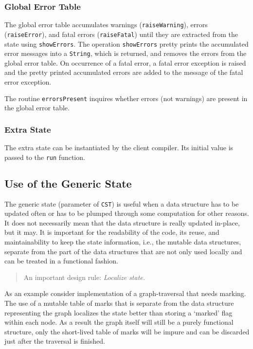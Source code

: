 \documentclass{report}
\newcommand{\code}[1]{\texttt{#1}}
\begin{document}
\subsubsection{Global Error Table}

The global error table accumulates warnings (\code{raiseWarning}), errors
(\code{raiseError}), and fatal errors (\code{raiseFatal}) until they are
extracted from the state using \code{showErrors}. The operation
\code{showErrors} pretty prints the accumulated error messages into a
\code{String}, which is returned, and removes the errors from the global error
table. On occurrence of a fatal error, a fatal error exception is raised and the
pretty printed accumulated errors are added to the message of the fatal error
exception.

The routine \code{errorsPresent} inquires whether errors (not warnings) are
present in the global error table. 

\subsubsection{Extra State}

The extra state can be instantiated by the client compiler.  Its initial value 
is passed to the \code{run} function.

\subsection{Use of the Generic State}
\label{sec:generic-state}

The generic state (parameter of \code{CST}) is useful when a data structure
has to be updated often or has to be plumped through some computation for
other reasons. It does not necessarily mean that the data structure is really
updated in-place, but it may. It is important for the readability of the code,
its reuse, and maintainability to keep the state information, i.e., the
mutable data structures, separate from the part of the data structures that
are not only used locally and can be treated in a functional fashion.
%
\begin{quote}
  An important design rule: \textit{Localize state.}
\end{quote}
%
As an example consider implementation of a graph-traversal that needs marking.
The use of a mutable table of marks that is separate from the data structure
representing the graph localizes the state better than storing a `marked' flag
within each node.  As a result the graph itself will still be a purely
functional structure, only the short-lived table of marks will be impure and
can be discarded just after the traversal is finished.
\end{document}
